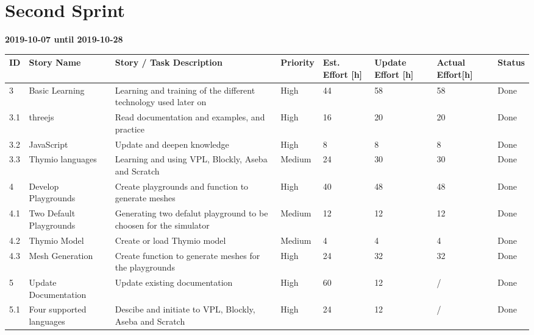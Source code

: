 \documentclass{scrreprt}
\begin{document}
\section{Second Sprint}
\textbf{2019-10-07 until 2019-10-28}
\begin{longtable}{p{5mm}|p{2cm}|p{4cm}|p{1cm}|p{1cm}|p{1cm}|p{1cm}|p{15mm}}
  ID                     & Story Name & Story / Task Description & Priority & Est. Effort {[}h{]} & Update Effort {[}h{]} & Actual Effort{[}h{]} & Status                \\ \hline
  3 & Basic Learning & Learning and training of the different technology used later on & High & 44 & 58 & 58 & Done \\
  3.1 & threejs & Read documentation and examples, and practice & High & 16 & 20 & 20 & Done \\ 
  3.2 & JavaScript & Update and deepen knowledge  & High & 8 & 8 & 8 & Done \\ 
  3.3 & Thymio languages & Learning and using VPL, Blockly, Aseba and Scratch & Medium & 24 & 30 & 30 & Done \\ 
  4 & Develop Playgrounds & Create playgrounds and function to generate meshes & High & 40 & 48 & 48 & Done \\ 
  4.1 & Two Default Playgrounds & Generating two defalut playground to be choosen for the simulator & Medium & 12 & 12 & 12 & Done \\ 
  4.2 & Thymio Model & Create or load Thymio model & Medium & 4 & 4 & 4 & Done \\ 
  4.3 & Mesh Generation & Create function to generate meshes for the playgrounds & High & 24 & 32 & 32 & Done \\ 
  5 & Update Documentation & Update existing documentation & High & 60 & 12 & {/} & Done \\
  5.1 & Four supported languages & Descibe and initiate to VPL, Blockly, Aseba and Scratch & High & 24 & 12 & {/} & Done \\ 
\end{longtable}
\end{document}

